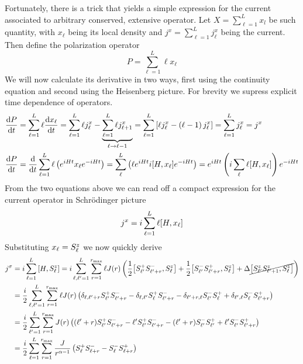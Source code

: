 Fortunately, there is a trick that yields a simple expression for the current
associated to arbitrary conserved, extensive operator. Let \(X = \sum^{L}_{\ell=1}x_l\) be such quantity,
with \(x_{\ell}\) being its local density and \(j^x = \sum^{L}_{\ell=1} j^x_{\ell}\) being the current.
Then define the polarization operator
\begin{equation}
    P = \sum^{L}_{\ell=1}\ell x_{\ell}
\end{equation}
We will now calculate its derivative in two ways, first using the continuity equation and second using
the Heisenberg picture. For brevity we supress explicit time dependence of operators.
\begin{align}
    \dv{P}{t} &= \sum^{L}_{\ell=1} \ell \dv{x_{\ell}}{t} = 
     \sum^{L}_{\ell=1} \ell j^x_{\ell} - \underbrace{\sum_{\ell=1}^{L} \ell j^x_{\ell+1}}_{\ell \to \ell - 1}
     = \sum_{\ell=1}^{L} \left[\ell j^x_{\ell} - \left(\ell-1\right)j^{x}_{\ell}\right]
     = \sum_{\ell=1}^L j^x_{\ell} = j^x\\
     \dv{P}{t} &= \dv{t} \sum_{\ell=1}^L \ell \left(e^{i H t}x_{\ell} e^{-i H t}\right) = 
     \sum_{\ell}^{L} \left(\ell e^{i H t} i \comm{H}{x_{\ell}}e^{-i H t}\right) = 
     e^{i H t} \left(i \sum_{\ell} \ell \comm{H}{x_{\ell}}\right)e^{-i H t}
\end{align}
From the two equations above we can read off a compact expression for the current operator in Schr{\"o}dinger
picture
\begin{equation}
    j^x = i \sum_{\ell=1}^L \ell\comm{H}{x_{\ell}}
    \label{eq:polarization}
\end{equation}
Substituting \(x_{\ell} = S^{z}_{\ell}\) we now quickly derive
\begin{align}
    j^{\sigma} &= i \sum_{\ell=1}^L \comm{H}{\Sz_{\ell}} = i \sum_{\ell,\ell^{\prime}=1}^L \sum_{r=1}^{r_{\mathrm{max}}}
    \ell J(r) \left(\frac{1}{2}\comm{\Sp_{\ell^{\prime}}\Sm_{\ell^{\prime}+r}}{\Sz_{\ell}}
    + \frac{1}{2}\comm{\Sm_{\ell^{\prime}}\Sp_{\ell^{\prime}+r}}{\Sz_{\ell}}
    + \Delta \cancel{\comm{\Sz_{\ell^{\prime}}\Sz_{\ell^{\prime}+1}}{\Sz_{\ell}}} \right) \nonumber \\
    &= \frac{i}{2}  \sum_{\ell,\ell^{\prime}=1}^L \sum_{r=1}^{r_{\mathrm{max}}}\ell J(r)  \left(
        \delta_{\ell,\ell^{\prime}+r}\Sp_{\ell^{\prime}} \Sm_{\ell^{\prime}+r}  - \delta_{\ell,\ell^{\prime}}
        \Sp_{\ell}\Sm_{\ell^{\prime}+r} - \delta_{\ell^{\prime} + r, \ell} \Sm_{\ell^{\prime}} \Sp_{\ell} + 
        \delta_{\ell^{\prime},\ell}\Sm_{\ell}\Sp_{\ell^{\prime}+r}
    \right) \nonumber \\
    &= \frac{i}{2}  \sum_{\ell^{\prime}=1}^L \sum_{r=1}^{r_{\mathrm{max}}} J(r)  \left(
        (\ell^{\prime}+r)\Sp_{\ell^{\prime}} \Sm_{\ell^{\prime}+r}  - \ell^{\prime}
        \Sp_{\ell^{\prime}}\Sm_{\ell^{\prime}+r} - (\ell^{\prime}+r) \Sm_{\ell^{\prime}} \Sp_{\ell^{\prime}} + 
        \ell^{\prime}\Sm_{\ell^{\prime}}\Sp_{\ell^{\prime}+r} 
    \right) \nonumber\\
    &= \frac{i}{2} \sum_{\ell=1}^L \sum_{r=1}^{r_{\mathrm{max}}} \frac{J}{r^{\alpha-1}}
    \left(\Sp_{\ell}\Sm_{\ell+r}-\Sm_{\ell}\Sp_{\ell+r}\right)
    \label{eq:spin_current}
\end{align}
